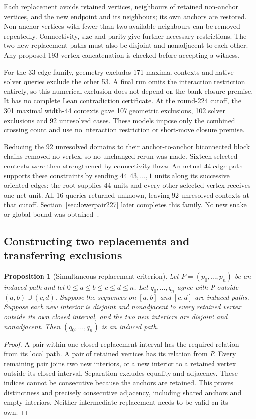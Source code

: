 \documentclass[11pt,a4paper]{article}
\newtheorem{proposition}[theorem]{Proposition}
\theoremstyle{definition}
\theoremstyle{remark}
\begin{document}
Each replacement avoids retained vertices, neighbours of retained
non-anchor vertices, and the new endpoint and its neighbours; its own
anchors are restored. Non-anchor vertices with fewer than two available
neighbours can be removed repeatedly. Connectivity, size and parity
give further necessary restrictions. The two new replacement paths
must also be disjoint and nonadjacent to each other. Any proposed
193-vertex concatenation is checked before accepting a witness.

For the 33-edge family, geometry excludes 171 maximal contexts and
native solver queries exclude the other 53. A final run omits the
interaction restriction entirely, so this numerical exclusion does
not depend on the bank-closure premise. It has no complete Lean
contradiction certificate. At the round-224 cutoff, the 301 maximal width-44 contexts
gave 107 geometric exclusions, 102 solver exclusions and 92 unresolved
cases. These models impose only the combined crossing count and use
no interaction restriction or short-move closure premise.

Reducing the 92 unresolved domains to their anchor-to-anchor
biconnected block chains removed no vertex, so no unchanged rerun was
made. Sixteen selected contexts were then strengthened by connectivity
flows. An actual 44-edge path supports these constraints by sending
$44,43,\ldots,1$ units along its successive oriented edges: the root
supplies 44 units and every other selected vertex receives one net unit.
All 16 queries returned unknown, leaving 92 unresolved contexts at that
cutoff. Section~\ref{sec:lowerpair227} later completes this family. No new
snake or global bound was obtained~\cite{research224}.

\subsection{Constructing two replacements and transferring exclusions}
\label{sec:replacement225}
\begin{proposition}[Simultaneous replacement criterion]
\label{prop:simultaneous225}
Let $P=(p_0,\ldots,p_n)$ be an induced path and let
$0\le a\le b\le c\le d\le n$. Let $q_0,\ldots,q_n$ agree with $P$
outside $(a,b)\cup(c,d)$. Suppose the sequences on $[a,b]$ and $[c,d]$
are induced paths. Suppose each new interior is disjoint and nonadjacent
to every retained vertex outside its own closed interval, and the two
new interiors are disjoint and nonadjacent. Then $(q_0,\ldots,q_n)$ is
an induced path.
\end{proposition}
\begin{proof}
A pair within one closed replacement interval has the required relation
from its local path. A pair of retained vertices has its relation from
$P$. Every remaining pair joins two new interiors, or a new interior
to a retained vertex outside its closed interval. Separation excludes
equality and adjacency. These indices cannot be consecutive because
the anchors are retained. This proves distinctness and precisely
consecutive adjacency, including shared anchors and empty interiors.
Neither intermediate replacement needs to be valid on its own.
\end{proof}
\end{document}
